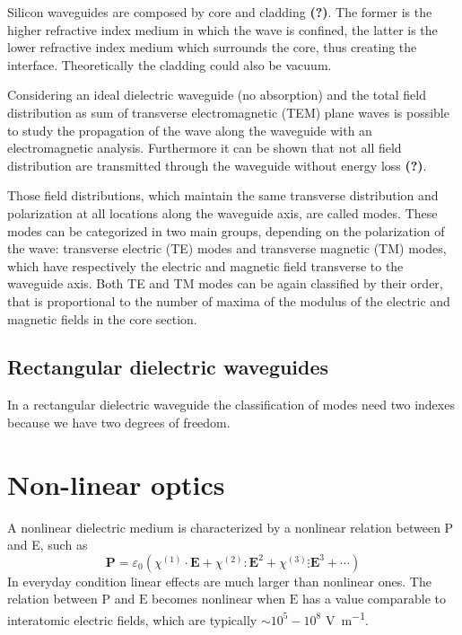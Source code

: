 \documentclass[12pt,a4paper,twocolumn,twoside]{article}
\begin{document}
Silicon waveguides are composed by core and cladding \textbf{(?)}. %
The former is the higher refractive index medium in which the wave is confined, the latter is the lower refractive index medium which surrounds the core, thus creating the interface. Theoretically the cladding could also be vacuum.

Considering an ideal dielectric waveguide (no absorption) and the total field distribution as sum of transverse electromagnetic (TEM) plane waves is possible to study the propagation of the wave along the waveguide with an electromagnetic analysis.
Furthermore it can be shown that not all field distribution are transmitted through the waveguide without energy loss \textbf{(?)}.

Those field distributions, which maintain the same transverse distribution and polarization at all locations along the waveguide axis, are called modes.
These modes can be categorized in two main groups, depending on the polarization of the wave: transverse electric (TE) modes and transverse magnetic (TM) modes, which have respectively the electric and magnetic field transverse to the waveguide axis.
Both TE and TM modes can be again classified by their order, that is proportional to the number of maxima of the modulus of the electric and magnetic fields in the core section.


\subsection{Rectangular dielectric waveguides}
In a rectangular dielectric waveguide the classification of modes need two indexes because we have two degrees of freedom.

\section{Non-linear optics}
A nonlinear dielectric medium is characterized by a nonlinear relation between P and E, such as
$$\textbf{P} = \varepsilon_0 \left( \chi^{(1)} \cdot \textbf{E} + \chi^{(2)} : \textbf{E}^2 + \chi^{(3)} \vdots \textbf{E}^3 + \cdots \right) $$
In everyday condition linear effects are much larger than nonlinear ones.
The relation between $\mathrm{P}$ and $\mathrm{E}$ becomes nonlinear when $\mathrm{E}$ has a value comparable to interatomic electric fields, which are typically $\sim 10^5-10^8$ \si{\V\per\m}.
\end{document}
